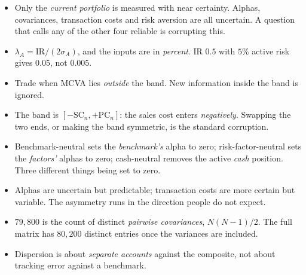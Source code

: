 \begin{imtrapbox}[title={Consolidated trap summary --- IM-4}]
\begin{itemize}
\item {} Only the \emph{current portfolio} is measured with
near certainty. Alphas, covariances, transaction costs and risk aversion are all
uncertain. A question that calls any of the other four reliable is corrupting
this.
\item {} $\lambda_A = \text{IR}/(2\sigma_A)$, and the inputs
are in \emph{percent}. IR $0.5$ with $5\%$ active risk gives $0.05$, not $0.005$.
\item {} Trade when MCVA lies \emph{outside} the band. New
information inside the band is ignored.
\item {} The band is $[-\text{SC}_n, +\text{PC}_n]$: the sales
cost enters \emph{negatively}. Swapping the two ends, or making the band
symmetric, is the standard corruption.
\item {} Benchmark-neutral sets the \emph{benchmark's} alpha
to zero; risk-factor-neutral sets the \emph{factors'} alphas to zero;
cash-neutral removes the active \emph{cash} position. Three different things
being set to zero.
\item {} Alphas are uncertain but predictable;
transaction costs are more certain but variable. The asymmetry runs in the
direction people do not expect.
\item {} $79{,}800$ is the count of distinct
\emph{pairwise covariances}, $N(N-1)/2$. The full matrix has $80{,}200$ distinct
entries once the variances are included.
\item {} Dispersion is about \emph{separate accounts} against
the composite, not about tracking error against a benchmark.
\end{itemize}
\end{imtrapbox}

